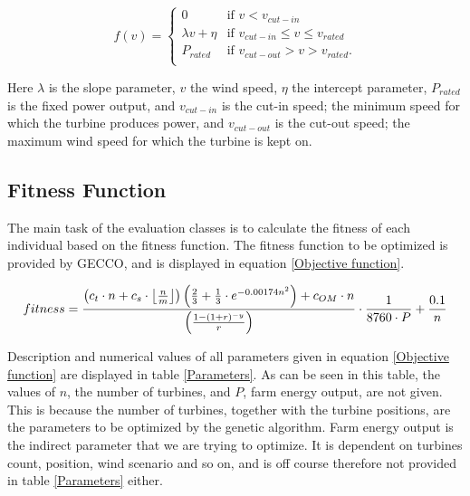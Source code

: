\begin{equation}
 f(v) = 
  \begin{cases} 
   0                                  & \text{if }     v < v_{cut-in} \\
   \lambda v + \eta           & \text{if }     v_{cut-in} \leq v \leq v_{rated} \\
   P_{rated}                        & \text{if }     v_{cut-out} > v > v_{rated}. \\
  \end{cases}
  \label{equation:Power Curv (API)}
\end{equation}

\noindent Here $\lambda$ is the slope parameter, $v$ the wind speed, $\eta$ the intercept parameter, $P_{rated}$ is the fixed power output, and $v_{cut-in}$ is the cut-in speed; the minimum speed for which the turbine produces power, and $v_{cut-out}$ is the cut-out speed; the maximum wind speed for which the turbine is kept on. 


\subsection{Fitness Function}\label{subsection:fitness function}
The main task of the evaluation classes is to calculate the fitness of each individual based on the fitness function.  The fitness function to be optimized is provided by GECCO, and is displayed in equation \ref{Objective function}.\\

\begin{small}
\begin{equation}
fitness =  \frac{ \left( c_t \cdot n + c_s \cdot \floor*{\frac{n}{m}} \right) \left( \frac{2}{3} + \frac{1}{3} \cdot e^{-0.00174n^2} \right) + c_{OM} \cdot n}{\left( \frac{1 - (1 + r)^{-y}}{r} \right) } \cdot \frac{1}{8760 \cdot P} + \frac{0.1}{n}
\label{Objective function} 
\end{equation}
\end{small}


\noindent Description and numerical values of all parameters given in equation \ref{Objective function} are displayed in table \ref{Parameters}. As can be seen in this table, the values of $n$, the number of turbines, and $P$, farm energy output, are not given. This is because the number of turbines, together with the turbine positions, are the parameters to be optimized by the genetic algorithm. Farm energy output is the indirect parameter that we are trying to optimize. It is dependent on turbines count, position, wind scenario and so on, and is off course therefore not provided in table \ref{Parameters} either.\\


